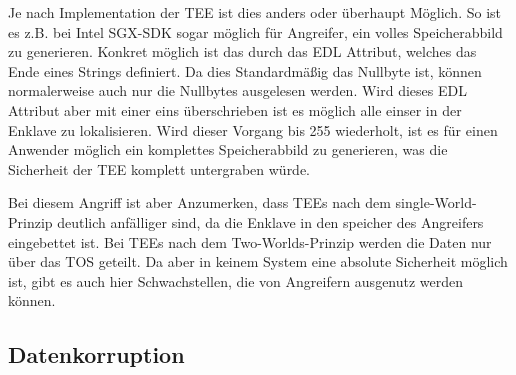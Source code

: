 Je nach Implementation der TEE ist dies anders oder überhaupt Möglich. So ist es z.B. bei Intel SGX-SDK sogar möglich für Angreifer, ein volles Speicherabbild zu generieren. Konkret möglich ist das durch das EDL Attribut, welches das Ende eines Strings definiert. Da dies Standardmäßig das Nullbyte ist, können normalerweise auch nur die Nullbytes ausgelesen werden. Wird dieses EDL Attribut aber mit einer eins überschrieben ist es möglich alle einser in der Enklave zu lokalisieren. Wird dieser Vorgang bis 255 wiederholt, ist es für einen Anwender möglich ein komplettes Speicherabbild zu generieren, was die Sicherheit der TEE komplett untergraben würde. \cite{IntelSGX} \cite{TEEPaper}

Bei diesem Angriff ist aber Anzumerken, dass TEEs nach dem single-World-Prinzip deutlich anfälliger sind, da die Enklave in den speicher des Angreifers eingebettet ist. Bei TEEs nach dem Two-Worlds-Prinzip werden die Daten nur über das TOS geteilt. Da aber in keinem System eine absolute Sicherheit möglich ist, gibt es auch hier Schwachstellen, die von Angreifern ausgenutz werden können.

\subsection{Datenkorruption}

